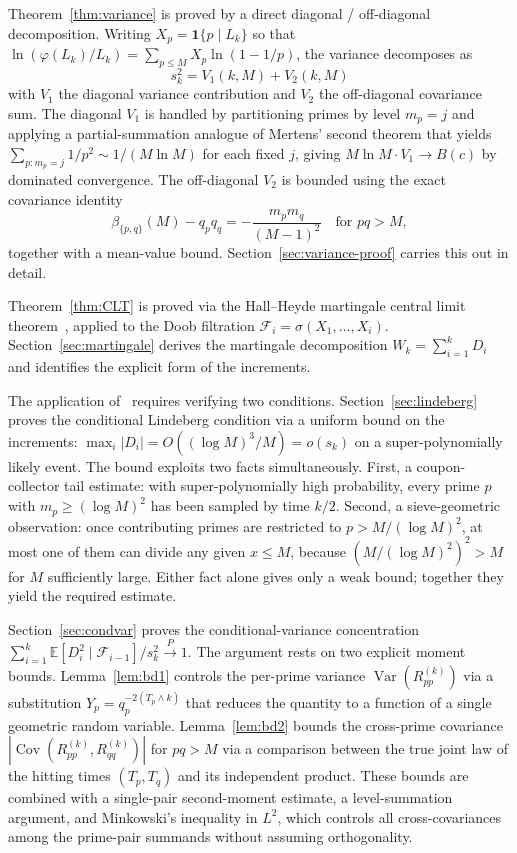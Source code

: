 \documentclass[11pt]{article}
\theoremstyle{remark}
\newcommand{\EE}{\mathbb{E}}
\newcommand{\F}{\mathcal{F}}
\newcommand{\one}{\mathbf{1}}
\DeclareMathOperator{\Var}{Var}
\DeclareMathOperator{\Cov}{Cov}
\begin{document}
Theorem~\ref{thm:variance} is proved by a direct diagonal / off-diagonal decomposition. Writing $X_p = \one\{p \mid L_k\}$ so that $\ln(\varphi(L_k)/L_k) = \sum_{p \leq M} X_p \ln(1 - 1/p)$, the variance decomposes as
\[
s_k^2 = V_1(k, M) + V_2(k, M)
\]
with $V_1$ the diagonal variance contribution and $V_2$ the off-diagonal covariance sum. The diagonal $V_1$ is handled by partitioning primes by level $m_p = j$ and applying a partial-summation analogue of Mertens' second theorem that yields $\sum_{p \colon m_p = j} 1/p^2 \sim 1/(M \ln M)$ for each fixed $j$, giving $M \ln M \cdot V_1 \to B(c)$ by dominated convergence. The off-diagonal $V_2$ is bounded using the exact covariance identity
\[
\beta_{\{p,q\}}(M) - q_p q_q = -\frac{m_p m_q}{(M-1)^2} \quad \text{for } pq > M,
\]
together with a mean-value bound. Section~\ref{sec:variance-proof} carries this out in detail.

Theorem~\ref{thm:CLT} is proved via the Hall--Heyde martingale central limit theorem~\cite[Thm.~3.2]{HH}, applied to the Doob filtration $\F_i = \sigma(X_1, \ldots, X_i)$. Section~\ref{sec:martingale} derives the martingale decomposition $W_k = \sum_{i=1}^k D_i$ and identifies the explicit form of the increments.

The application of~\cite{HH} requires verifying two conditions. Section~\ref{sec:lindeberg} proves the conditional Lindeberg condition via a uniform bound on the increments: $\max_i |D_i| = O((\log M)^3/M) = o(s_k)$ on a super-polynomially likely event. The bound exploits two facts simultaneously. First, a coupon-collector tail estimate: with super-polynomially high probability, every prime $p$ with $m_p \geq (\log M)^2$ has been sampled by time $k/2$. Second, a sieve-geometric observation: once contributing primes are restricted to $p > M/(\log M)^2$, at most one of them can divide any given $x \leq M$, because $(M/(\log M)^2)^2 > M$ for $M$ sufficiently large. Either fact alone gives only a weak bound; together they yield the required estimate.

Section~\ref{sec:condvar} proves the conditional-variance concentration $\sum_{i=1}^k \EE[D_i^2 \mid \F_{i-1}]/s_k^2 \xrightarrow{P} 1$. The argument rests on two explicit moment bounds. Lemma~\ref{lem:bd1} controls the per-prime variance $\Var(R_{pp}^{(k)})$ via a substitution $Y_p = q_p^{-2(T_p \wedge k)}$ that reduces the quantity to a function of a single geometric random variable. Lemma~\ref{lem:bd2} bounds the cross-prime covariance $|\Cov(R_{pp}^{(k)}, R_{qq}^{(k)})|$ for $pq > M$ via a comparison between the true joint law of the hitting times $(T_p, T_q)$ and its independent product. These bounds are combined with a single-pair second-moment estimate, a level-summation argument, and Minkowski's inequality in $L^2$, which controls all cross-covariances among the prime-pair summands without assuming orthogonality.
\end{document}
